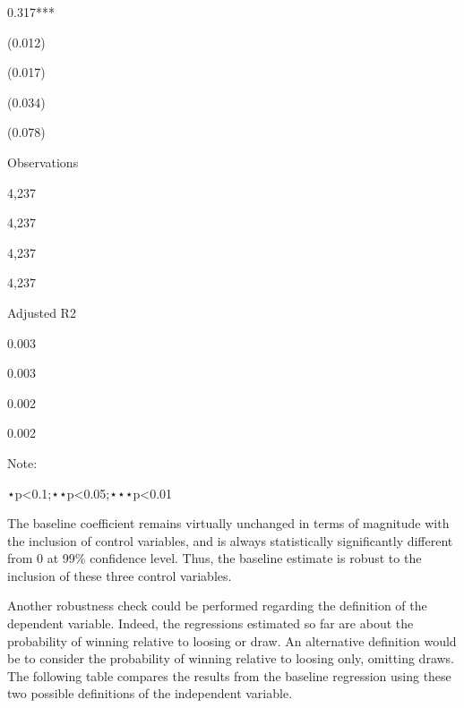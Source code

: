 \documentclass[
]{article}
\newenvironment{Shaded}{\begin{snugshade}}{\end{snugshade}}
\newcommand{\CommentTok}[1]{\textcolor[rgb]{0.56,0.35,0.01}{\textit{#1}}}
\newcommand{\DataTypeTok}[1]{\textcolor[rgb]{0.13,0.29,0.53}{#1}}
\newcommand{\KeywordTok}[1]{\textcolor[rgb]{0.13,0.29,0.53}{\textbf{#1}}}
\newcommand{\NormalTok}[1]{#1}
\newcommand{\OperatorTok}[1]{\textcolor[rgb]{0.81,0.36,0.00}{\textbf{#1}}}
\newcommand{\OtherTok}[1]{\textcolor[rgb]{0.56,0.35,0.01}{#1}}
\newcommand{\StringTok}[1]{\textcolor[rgb]{0.31,0.60,0.02}{#1}}
\begin{document}
0.317***

(0.012)

(0.017)

(0.034)

(0.078)

Observations

4,237

4,237

4,237

4,237

Adjusted R2

0.003

0.003

0.002

0.002

Note:

⋆p\textless0.1;⋆⋆p\textless0.05;⋆⋆⋆p\textless0.01

The baseline coefficient remains virtually unchanged in terms of
magnitude with the inclusion of control variables, and is always
statistically significantly different from 0 at 99\% confidence level.
Thus, the baseline estimate is robust to the inclusion of these three
control variables.

Another robustness check could be performed regarding the definition of
the dependent variable. Indeed, the regressions estimated so far are
about the probability of winning relative to loosing or draw. An
alternative definition would be to consider the probability of winning
relative to loosing only, omitting draws. The following table compares
the results from the baseline regression using these two possible
definitions of the independent variable.

\begin{Shaded}
\end{Shaded}
\end{document}
